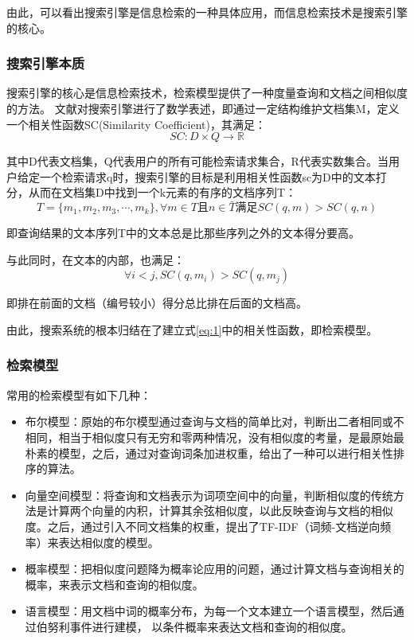 \documentclass[12pt,a4paper]{article}
\begin{document}
	由此，可以看出搜索引擎是信息检索的一种具体应用，而信息检索技术是搜索引擎的核心。
		\subsubsection{搜索引擎本质}
	搜索引擎的核心是信息检索技术，检索模型提供了一种度量查询和文档之间相似度的方法。\nocite{24} 文献\cite{25}对搜索引擎进行了数学表述，即通过一定结构维护文档集M，定义一个相关性函数SC(Similarity Coefficient)，其满足：
	\begin{equation}\label{eq:1}
	 SC: D \times Q \longrightarrow \mathbb{R}
	\end{equation}
	
	其中D代表文档集，Q代表用户的所有可能检索请求集合，R代表实数集合。当用户给定一个检索请求q时，搜索引擎的目标是利用相关性函数sc为D中的文本打分，从而在文档集D中找到一个k元素的有序的文档序列T：
	\begin{equation}
	T=\{ m_{1},m_{2},m_{3},\cdots, m_{k} \},\forall m \in T 且 n \in \bar{T} 满足 SC(q,m)>SC(q,n)
	\end{equation}
	
	即查询结果的文本序列T中的文本总是比那些序列之外的文本得分要高。
	
	与此同时，在文本的内部，也满足：
	\begin{equation}
	\forall i < j, SC(q,m_{i})>SC(q,m_{j})
	\end{equation}
	
	即排在前面的文档（编号较小）得分总比排在后面的文档高。
	
	由此，搜索系统的根本归结在了建立式\ref{eq:1}中的相关性函数，即检索模型。
		\subsubsection{检索模型}
	常用的检索模型有如下几种：
	\begin{itemize}
		\item
	布尔模型：原始的布尔模型通过查询与文档的简单比对，判断出二者相同或不相同，相当于相似度只有无穷和零两种情况，没有相似度的考量，是最原始最朴素的模型，之后，通过对查询词条加进权重，给出了一种可以进行相关性排序的算法。\cite{salton1970}
		\item
	向量空间模型：将查询和文档表示为词项空间中的向量，判断相似度的传统方法是计算两个向量的内积，计算其余弦相似度，以此反映查询与文档的相似度。\cite{salton1975}之后，通过引入不同文档集的权重，提出了TF-IDF（词频-文档逆向频率）\cite{robertson1976}来表达相似度的模型。
		\item
	概率模型：把相似度问题降为概率论应用的问题，通过计算文档与查询相关的概率，来表示文档和查询的相似度。
		\item
	语言模型：用文档中词的概率分布，为每一个文本建立一个语言模型，然后通过伯努利事件进行建模， 以条件概率来表达文档和查询的相似度。\cite{ponte1998}
	\end{itemize}
	
\end{document}
